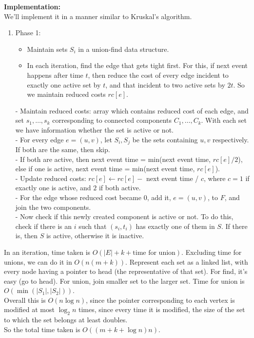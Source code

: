 \documentclass[a4paper]{article}
\newcommand{\nl}{\vspace{0.2cm}\\}
\begin{document}
\textbf{Implementation:}\nl
We'll implement it in a manner similar to Kruskal's algorithm.
\begin{enumerate}
    \item Phase 1:
        \begin{itemize}
            \item Maintain sets $S_i$ in a union-find data structure.
            \item In each iteration, find the edge that gets tight first. For this, if next event happens after time $t$, then reduce the cost of every edge incident to exactly one active set by
                $t$, and that incident to two active sets by $2t$. So we maintain reduced costs $rc[e]$.
        \end{itemize}
        - Maintain reduced costs: array which contains reduced cost of each edge, and set $s_1, \ldots, s_k$ corresponding to connected components $C_1, \ldots, C_k$. With each set we have information
        whether the set is active or not.\nl
        - For every edge $e = (u, v)$, let $S_i, S_j$ be the sets containing $u, v$ respectively. If both are the same, then skip.\nl
        - If both are active, then next event time = min(next event time, $rc[e] / 2$), else if one is active, next event time = min(next event time, $rc[e]$).\nl
        - Update reduced costs: $rc[e] \gets rc[e] -$ next event time / $c$, where $c = 1$ if exactly one is active, and $2$ if both active.\nl
        - For the edge whose reduced cost became $0$, add it, $e = (u, v)$, to $F$, and join the two components.\nl
        - Now check if this newly created component is active or not. To do this, check if there is an $i$ such that $(s_i, t_i)$ has exactly one of them in $S$. If there is, then $S$ is active,
        otherwise it is inactive.
\end{enumerate}

In an iteration, time taken is $O(|E| + k + \text{time for union})$. Excluding time for unions, we can do it in $O(n(m + k))$.
Represent each set as a linked list, with every node having a pointer to head (the representative of that set). For find, it's easy (go to head). For union, join smaller set to the larger
set. Time for union is $O(\min(|S_1|, |S_2|))$.\nl
Overall this is $O(n \log n)$, since the pointer corresponding to each vertex is modified at most $\log_2 n$ times, since every time it is modified, the size of the set to which the set belongs
at least doubles.\nl
So the total time taken is $O((m + k + \log n) n)$.
\end{document}
